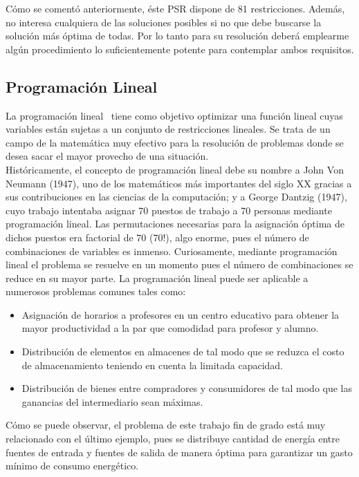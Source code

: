 Cómo se comentó anteriormente, éste PSR dispone de 81 restricciones. Además, no interesa cualquiera de las soluciones posibles si no que debe buscarse la solución más óptima de todas. Por lo tanto para su resolución deberá emplearme algún procedimiento lo suficientemente potente para contemplar ambos requisitos.
\subsection{Programación Lineal}
La programación lineal~\cite{Loom64} tiene como objetivo optimizar una función lineal cuyas variables están sujetas a un conjunto de restricciones lineales.
Se trata de un campo de la matemática muy efectivo para la resolución de problemas donde se desea sacar el mayor provecho de una situación.\\

Históricamente, el concepto de programación lineal debe su nombre a John Von Neumann (1947), uno de los matemáticos más importantes del siglo XX gracias a sus contribuciones en las ciencias de la computación; y a George Dantzig (1947), cuyo trabajo intentaba asignar 70 puestos de trabajo a 70 personas mediante programación lineal. Las permutaciones necesarias para la asignación óptima de dichos puestos era factorial de 70 (70!), algo enorme, pues el número de combinaciones de variables es inmenso. Curiosamente, mediante programación lineal el problema se resuelve en un momento pues el número de combinaciones se reduce en su mayor parte. La programación lineal puede ser aplicable a numerosos problemas comunes tales como:
\begin{itemize}
\item Asignación de horarios a profesores en un centro educativo para obtener la mayor productividad a la par que comodidad para profesor y alumno.
\item Distribución de elementos en almacenes de tal modo que se reduzca el costo de almacenamiento teniendo en cuenta la limitada capacidad.
\item Distribución de bienes entre compradores y consumidores de tal modo que las ganancias del intermediario sean máximas.
\end{itemize}
Cómo se puede observar, el problema de este trabajo fin de grado está muy relacionado con el último ejemplo, pues se distribuye cantidad de energía entre fuentes de entrada y fuentes de salida de manera óptima para garantizar un gasto mínimo de consumo energético.\\

